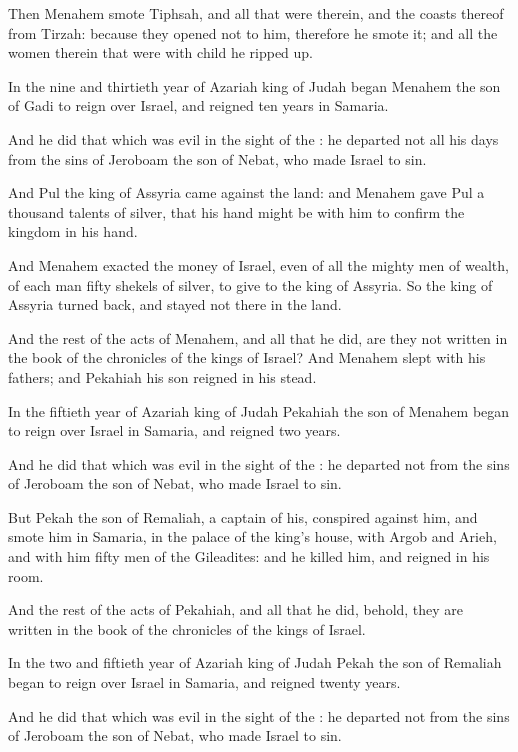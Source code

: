 \Verse Then Menahem smote Tiphsah, and all that were therein, and the coasts thereof from Tirzah: because they opened not to him, therefore he smote it; and all the women therein that were with child he ripped up.

\Verse In the nine and thirtieth year of Azariah king of Judah began Menahem the son of Gadi to reign over Israel, and reigned ten years in Samaria.

\Verse And he did that which was evil in the sight of the \LORD: he departed not all his days from the sins of Jeroboam the son of Nebat, who made Israel to sin.

\Verse And Pul the king of Assyria came against the land: and Menahem gave Pul a thousand talents of silver, that his hand might be with him to confirm the kingdom in his hand.

\Verse And Menahem exacted the money of Israel, even of all the mighty men of wealth, of each man fifty shekels of silver, to give to the king of Assyria. So the king of Assyria turned back, and stayed not there in the land.

\Verse And the rest of the acts of Menahem, and all that he did, are they not written in the book of the chronicles of the kings of Israel?  \Verse And Menahem slept with his fathers; and Pekahiah his son reigned in his stead.

\Verse In the fiftieth year of Azariah king of Judah Pekahiah the son of Menahem began to reign over Israel in Samaria, and reigned two years.

\Verse And he did that which was evil in the sight of the \LORD: he departed not from the sins of Jeroboam the son of Nebat, who made Israel to sin.

\Verse But Pekah the son of Remaliah, a captain of his, conspired against him, and smote him in Samaria, in the palace of the king's house, with Argob and Arieh, and with him fifty men of the Gileadites: and he killed him, and reigned in his room.

\Verse And the rest of the acts of Pekahiah, and all that he did, behold, they are written in the book of the chronicles of the kings of Israel.

\Verse In the two and fiftieth year of Azariah king of Judah Pekah the son of Remaliah began to reign over Israel in Samaria, and reigned twenty years.

\Verse And he did that which was evil in the sight of the \LORD: he departed not from the sins of Jeroboam the son of Nebat, who made Israel to sin.

